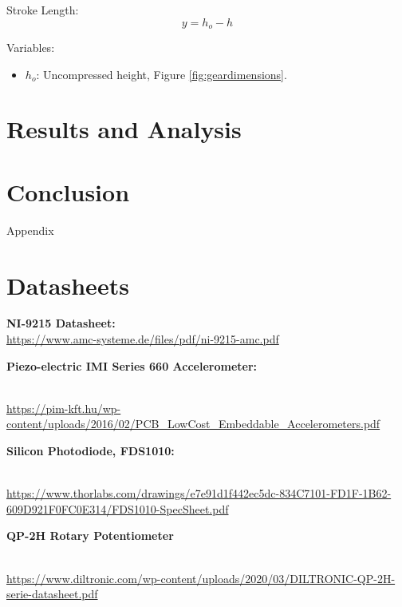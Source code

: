 \documentclass{article}
\begin{document}
Stroke Length:
\begin{equation}
    y = h_{o} - h
\end{equation}

Variables:
\begin{itemize}
    \item \(h_{o}\): Uncompressed height, Figure \ref{fig:geardimensions}. 
\end{itemize}
\vspace{5mm}
\section{Results and Analysis}

 
\section{Conclusion}



\newpage
\thispagestyle{empty}  %
\begin{center}
	\vspace*{\fill}
	{\Huge Appendix}
	\vspace*{\fill}
\end{center}

\newpage
\begin{appendices}
\pagestyle{fancy}
\renewcommand{\thefigure}{A\arabic{figure}}
\setcounter{figure}{0}



\pagebreak

\hypertarget{datasheets}{}
\section{Datasheets}
\begin{enumerate}[label = {[\arabic*]}]
\small
\item \textbf{NI-9215 Datasheet:}\\[2pt] \url{https://www.amc-systeme.de/files/pdf/ni-9215-amc.pdf}
\item \hypertarget{2}{\textbf{Piezo-electric IMI Series 660 Accelerometer:}}\\[2pt] \url{https://pim-kft.hu/wp-content/uploads/2016/02/PCB_LowCost_Embeddable_Accelerometers.pdf}
\item \hypertarget{3}{\textbf{Silicon Photodiode, FDS1010:}}\\[2pt] \url{https://www.thorlabs.com/drawings/e7e91d1f442ec5dc-834C7101-FD1F-1B62-609D921F0FC0E314/FDS1010-SpecSheet.pdf}
\item \hypertarget{4}{\textbf{QP-2H Rotary Potentiometer}}\\[2pt] \url{https://www.diltronic.com/wp-content/uploads/2020/03/DILTRONIC-QP-2H-serie-datasheet.pdf}


\end{enumerate}

\end{appendices}
\end{document}
